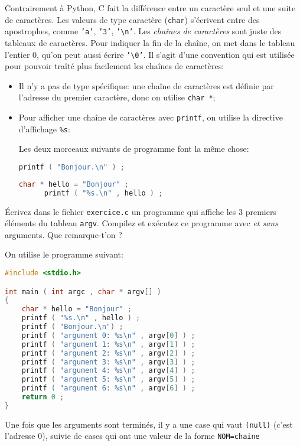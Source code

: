 \prerequis {}
Contrairement à Python, C fait la différence entre un caractère seul
et une suite de caractères.  Les valeurs de type caractère
(\texttt{char}) s'écrivent entre des apostrophes, comme \texttt{'a'},
\texttt{'3'}, \texttt{'\textbackslash n'}. Les \emph{chaînes de
  caractères} sont juste des tableaux de caractères. Pour indiquer la
fin de la chaîne, on met dans le tableau l'entier \(0\), qu'on peut
aussi écrire \texttt{'\textbackslash 0'}. Il s'agit d'une convention
qui est utilisée pour pouvoir traîté plus facilement les chaînes de
caractères:
\begin{itemize}
\item Il n'y a pas de type spécifique: une chaîne de caractères est
  définie par l'adresse du premier caractère, donc on utilise \texttt{char *};
\item Pour afficher une chaîne de caractères avec \texttt{printf}, on
  utilise la directive d'affichage \texttt{\%s}:
  \begin{exemple}
    Les deux morceaux suivants de programme font la même chose:
    \begin{lstlisting}[language=C]
      printf ( "Bonjour.\n" ) ;
    \end{lstlisting}
    \begin{lstlisting}[language=C]
      char * hello = "Bonjour" ;
      printf ( "%s.\n" , hello ) ;
    \end{lstlisting}
  \end{exemple}
\end{itemize}

\question Écrivez dans le fichier
\texttt{exercice.c} un programme qui affiche les 3
premiers éléments du tableau \texttt{argv}. Compilez et exécutez ce
programme avec \emph{et sans} arguments. Que remarque-t'on ?

\begin{solution}
  On utilise le programme suivant:
  \begin{lstlisting}[language=C]
#include <stdio.h>

int main ( int argc , char * argv[] )
{
    char * hello = "Bonjour" ;
    printf ( "%s.\n" , hello ) ;
    printf ( "Bonjour.\n") ;
    printf ( "argument 0: %s\n" , argv[0] ) ;
    printf ( "argument 1: %s\n" , argv[1] ) ;
    printf ( "argument 2: %s\n" , argv[2] ) ;
    printf ( "argument 3: %s\n" , argv[3] ) ;
    printf ( "argument 4: %s\n" , argv[4] ) ;
    printf ( "argument 5: %s\n" , argv[5] ) ;
    printf ( "argument 6: %s\n" , argv[6] ) ;
    return 0 ;
}
  \end{lstlisting}
  Une fois que les arguments sont terminés, il y a une case qui vaut
  \texttt{(null)} (c'est l'adresse 0), suivie de cases qui ont une
  valeur de la forme \texttt{NOM=chaine}
\end{solution}

